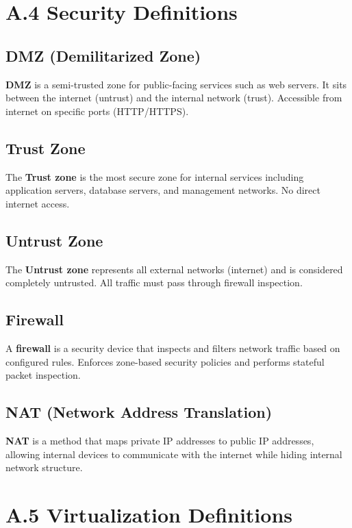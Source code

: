 \section*{A.4 Security Definitions}

\subsection*{DMZ (Demilitarized Zone)}
\label{def:dmz}
\textbf{DMZ} is a semi-trusted zone for public-facing services such as web 
servers. It sits between the internet (untrust) and the internal network 
(trust). Accessible from internet on specific ports (HTTP/HTTPS).

\subsection*{Trust Zone}
\label{def:trust}
The \textbf{Trust zone} is the most secure zone for internal services including 
application servers, database servers, and management networks. No direct 
internet access.

\subsection*{Untrust Zone}
\label{def:untrust}
The \textbf{Untrust zone} represents all external networks (internet) and is 
considered completely untrusted. All traffic must pass through firewall 
inspection.

\subsection*{Firewall}
\label{def:firewall}
A \textbf{firewall} is a security device that inspects and filters network 
traffic based on configured rules. Enforces zone-based security policies and 
performs stateful packet inspection.

\subsection*{NAT (Network Address Translation)}
\label{def:nat}
\textbf{NAT} is a method that maps private IP addresses to public IP addresses, 
allowing internal devices to communicate with the internet while hiding 
internal network structure.

\section*{A.5 Virtualization Definitions}

